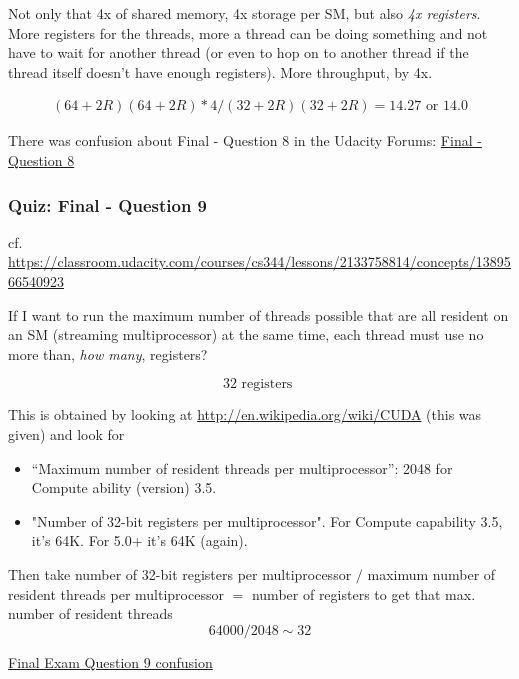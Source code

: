 \documentclass[10pt]{amsart}
\begin{document}
\begin{multicols*}{2}
Not only that 4x of shared memory, 4x storage per SM, but also \emph{4x registers}.  More registers for the threads, more a thread can be doing something and not have to wait for another thread (or even to hop on to another thread if the thread itself doesn't have enough registers).  More throughput, by 4x.

\begin{equation}
\begin{gathered}
  (64 + 2R)(64 + 2R) * 4 /   (32 + 2R)(32 + 2R) = \boxed{ 14.27 \text{ or } 14.0 }
  \end{gathered}
  \end{equation}


There was confusion about Final - Question 8 in the Udacity Forums: \href{https://discussions.udacity.com/t/final-question-8/46261}{Final - Question 8}

\subsubsection{Quiz: Final - Question 9}

cf. \url{https://classroom.udacity.com/courses/cs344/lessons/2133758814/concepts/1389566540923}

If I want to run the maximum number of threads possible that are all resident on an SM (streaming multiprocessor) at the same time, each thread must use no more than, \emph{how many}, registers?

\begin{equation}
\boxed{ 32  \text{ registers } }
  \end{equation}





This is obtained by looking at \url{http://en.wikipedia.org/wiki/CUDA} (this was given) and look for
\begin{itemize}
\item ``Maximum number of resident threads per multiprocessor'': 2048 for Compute ability (version) 3.5.
\item "Number of 32-bit registers per multiprocessor".  For Compute capability 3.5, it's 64K.  For 5.0+ it's 64K (again).  
  \end{itemize}
Then take number of 32-bit registers per multiprocessor $/$ maximum number of resident threads per multiprocessor $=$ number of registers to get that max. number of resident threads 
\[
64000/2048 \sim 32
\]

\href{https://discussions.udacity.com/t/final-exam-question-9-confusion/88637}{Final Exam Question 9 confusion}


\end{multicols*}
\end{document}
